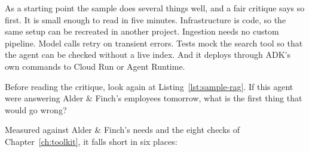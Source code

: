 As a starting point the sample does several things well, and a fair critique says so first. It is small enough to read in five minutes. Infrastructure is code, so the same setup can be recreated in another project. Ingestion needs no custom pipeline. Model calls retry on transient errors. Tests mock the search tool so that the agent can be checked without a live index. And it deploys through ADK's own commands to Cloud Run or Agent Runtime.

\begin{thinkabout}
Before reading the critique, look again at Listing~\ref{lst:sample-rag}. If this agent were answering Alder \& Finch's employees tomorrow, what is the first thing that would go wrong?
\end{thinkabout}

Measured against Alder \& Finch's needs and the eight checks of Chapter~\ref{ch:toolkit}, it falls short in six places:


